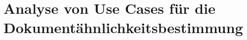\section{Analyse von Use Cases für die Dokumentähnlichkeitsbestimmung}
\label{sec:AnalyseUse}   





